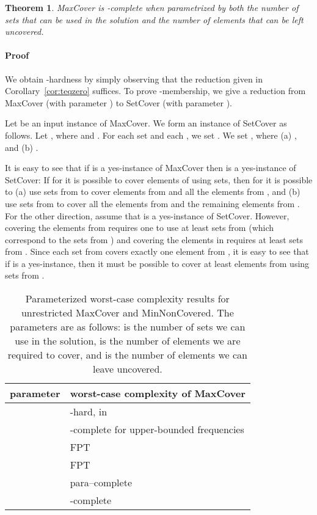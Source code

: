 \documentclass[11pt]{article}
\newtheorem{theorem}{Theorem}
\newenvironment{proof}{\paragraph{Proof}}{\hfill\medskip}
\begin{document}
\begin{theorem}
  MaxCover is -complete when parametrized by both the number
   of sets that can be used in the solution and the number  of
  elements that can be left uncovered.
\end{theorem}
\begin{proof}
  We obtain -hardness by simply observing that the reduction
  given in Corollary~\ref{cor:teqzero} suffices. To prove
  -membership, we give a reduction from MaxCover (with
  parameter ) to SetCover (with parameter ).

  Let  be an input instance of MaxCover.  We
  form an instance  of SetCover as follows.
  Let , where 
  and . For each set 
  and each , we set .  We set
  , where (a) , and (b) .

  It is easy to see that if  is a yes-instance of MaxCover
  then  is a yes-instance of SetCover: If for  it is possible
  to cover  elements of  using  sets, then for  it is
  possible to (a) use  sets from  to cover 
  elements from  and all the elements from , and (b) use 
  sets from  to cover all the elements from  and the
  remaining  elements from .  For the other direction, assume
  that  is a yes-instance of SetCover. However, covering the
  elements from  requires one to use at least  sets from
   (which correspond to the sets from ) and
  covering the elements in  requires at least  sets from
  . Since each set from  covers exactly one
  element from , it is easy to see that if  is a yes-instance,
  then it must be possible to cover at least  elements from
   using  sets from .
\end{proof}





\begin{table}
  \begin{center}
    \begin{tabular}{r|l}
      parameter  & {worst-case complexity of MaxCover} \\
      \hline
      \multirow{2}{*}{}      & {-hard, in }\\
               &  -complete for upper-bounded frequencies\\
      \rule{0cm}{5.5mm} 
            & FPT~\cite{bla:j:partial-set-cover} \\
        & FPT~\cite{bla:j:partial-set-cover} \\
      \rule{0cm}{5.5mm} 
           & para--complete \\
       & -complete   \\
  \end{tabular}
  \caption{\label{tab:complexity}Parameterized worst-case complexity
    results for unrestricted MaxCover and MinNonCovered. The
    parameters are as follows:  is the number of sets we can use in
    the solution,  is the number of elements we are required to
    cover, and  is the number of elements we can leave
    uncovered.}
  \end{center}
\end{table}
\end{document}
